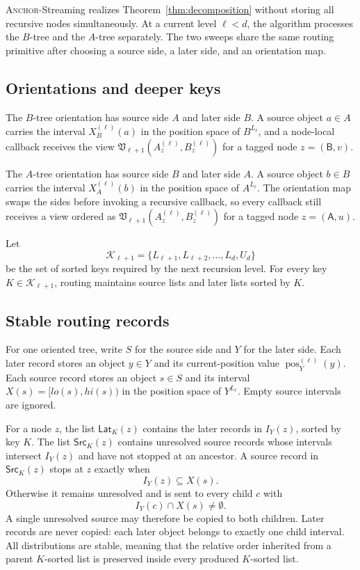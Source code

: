 \documentclass[11pt]{article}
\DeclareRobustCommand{\ANCHOR}{\textnormal{\textsc{Anchor}}}
\newcommand{\pos}{\operatorname{pos}}
\newcommand{\Src}{\ensuremath{\mathsf{Src}}}
\newcommand{\Lat}{\ensuremath{\mathsf{Lat}}}
\newcommand{\sideA}{\ensuremath{\mathsf A}}
\newcommand{\sideB}{\ensuremath{\mathsf B}}
\theoremstyle{definition}
\begin{document}
\ANCHOR-Streaming realizes Theorem~\ref{thm:decomposition} without storing all recursive nodes simultaneously.  At a current level $\ell<d$, the algorithm processes the $B$-tree and the $A$-tree separately.  The two sweeps share the same routing primitive after choosing a source side, a later side, and an orientation map.

\subsection{Orientations and deeper keys}

The $B$-tree orientation has source side $A$ and later side $B$.  A source object $a\in A$ carries the interval $X_B^{(\ell)}(a)$ in the position space of $B^{L_\ell}$, and a node-local callback receives the view $\mathfrak V_{\ell+1}(A_z^{(\ell)},B_z^{(\ell)})$ for a tagged node $z=(\sideB,v)$.

The $A$-tree orientation has source side $B$ and later side $A$.  A source object $b\in B$ carries the interval $X_A^{(\ell)}(b)$ in the position space of $A^{L_\ell}$.  The orientation map swaps the sides before invoking a recursive callback, so every callback still receives a view ordered as $\mathfrak V_{\ell+1}(A_z^{(\ell)},B_z^{(\ell)})$ for a tagged node $z=(\sideA,u)$.

Let
\[
  \mathcal K_{\ell+1}=\{L_{\ell+1},L_{\ell+2},\ldots,L_d,U_d\}
\]
be the set of sorted keys required by the next recursion level.  For every key $K\in\mathcal K_{\ell+1}$, routing maintains source lists and later lists sorted by $K$.

\subsection{Stable routing records}

For one oriented tree, write $S$ for the source side and $Y$ for the later side.  Each later record stores an object $y\in Y$ and its current-position value $\pos_Y^{(\ell)}(y)$.  Each source record stores an object $s\in S$ and its interval $X(s)=[lo(s),hi(s))$ in the position space of $Y^{L_\ell}$.  Empty source intervals are ignored.

For a node $z$, the list $\Lat_K(z)$ contains the later records in $I_Y(z)$, sorted by key $K$.  The list $\Src_K(z)$ contains unresolved source records whose intervals intersect $I_Y(z)$ and have not stopped at an ancestor.  A source record in $\Src_K(z)$ stops at $z$ exactly when
\[
  I_Y(z)\subseteq X(s).
\]
Otherwise it remains unresolved and is sent to every child $c$ with
\[
  I_Y(c)\cap X(s)\ne\emptyset.
\]
A single unresolved source may therefore be copied to both children.  Later records are never copied: each later object belongs to exactly one child interval.  All distributions are stable, meaning that the relative order inherited from a parent $K$-sorted list is preserved inside every produced $K$-sorted list.
\end{document}

